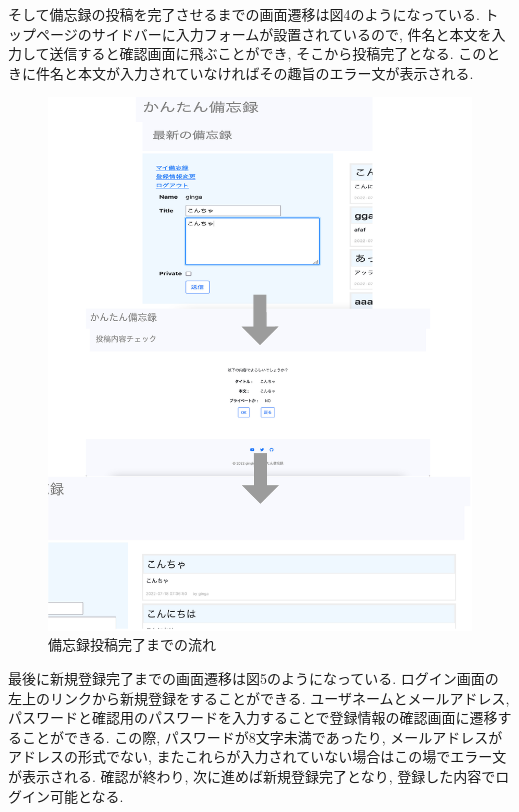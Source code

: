 \documentclass[submit,techrep]{ipsj}
\begin{document}
そして備忘録の投稿を完了させるまでの画面遷移は図4のようになっている. トップページのサイドバーに入力フォームが設置されているので, 件名と本文を入力して送信すると確認画面に飛ぶことができ, そこから投稿完了となる. このときに件名と本文が入力されていなければその趣旨のエラー文が表示される. 

\begin{figure}[h]
 \centering
 \includegraphics[scale=0.17]{toUpload.eps}
\caption{備忘録投稿完了までの流れ}
 \label{投稿まで}
\end{figure}

最後に新規登録完了までの画面遷移は図5のようになっている. 
ログイン画面の左上のリンクから新規登録をすることができる. ユーザネームとメールアドレス, パスワードと確認用のパスワードを入力することで登録情報の確認画面に遷移することができる. 
この際, パスワードが8文字未満であったり, メールアドレスがアドレスの形式でない, またこれらが入力されていない場合はこの場でエラー文が表示される. 確認が終わり, 次に進めば新規登録完了となり, 登録した内容でログイン可能となる. 
\end{document}
